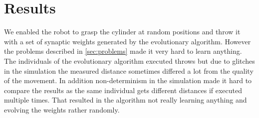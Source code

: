 \section{Results}
We enabled the robot to grasp the cylinder at random positions and throw it with a set of synaptic weights generated by the evolutionary algorithm.
However the problems described in \autoref{sec:problems} made it very hard to learn anything.
The individuals of the evolutionary algorithm executed throws but due to glitches in the simulation the measured distance sometimes differed a lot from the quality of the movement.
In addition non-determinism in the simulation made it hard to compare the results as the same individual gets different distances if executed multiple times.
That resulted in the algorithm not really learning anything and evolving the weights rather randomly.